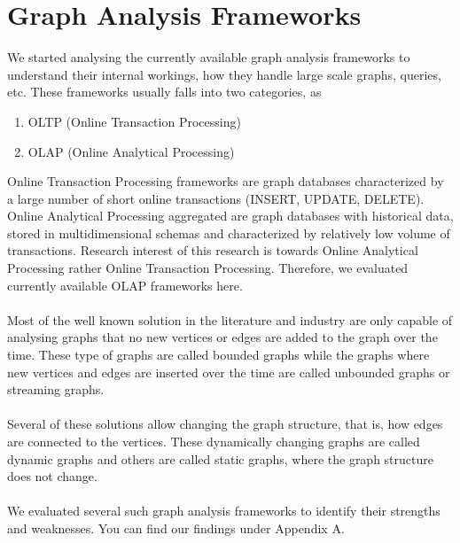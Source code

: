 \documentclass[12pt]{report}
\numberwithin{figure}{section}
\numberwithin{table}{section}
\begin{document}
\section{Graph Analysis Frameworks}
We started analysing the currently available graph analysis frameworks to understand their internal workings, how they handle large scale graphs, queries, etc. These frameworks usually falls into two categories, as
\begin{enumerate}
\item OLTP (Online Transaction Processing)
\item OLAP (Online Analytical Processing)
\end{enumerate}

Online Transaction Processing frameworks are graph databases characterized by a large number of short online transactions (INSERT, UPDATE, DELETE). Online Analytical Processing aggregated are graph databases with historical data, stored in multidimensional schemas and characterized by relatively low volume of transactions. Research interest of this research is towards Online Analytical Processing rather Online Transaction Processing. Therefore, we evaluated currently available OLAP frameworks here.

\paragraph{}

Most of the well known solution in the literature and industry are only capable of analysing graphs that no new vertices or edges are added to the graph over the time. These type of graphs are called bounded graphs while the graphs where new vertices and edges are inserted  over the time are called unbounded graphs or streaming graphs. 

\paragraph{}

Several of these solutions allow changing the graph structure, that is, how edges are connected to the vertices. These dynamically changing graphs are called dynamic graphs and others are called static graphs, where the graph structure does not change.

\paragraph{}

We evaluated several such graph analysis frameworks to identify their strengths and weaknesses. You can find our findings under Appendix A.
\end{document}
